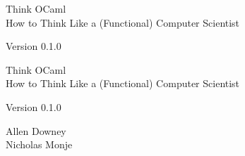 \documentclass[10pt]{book}
\newcommand{\theversion}{0.1.0}
\begin{document}
\frontmatter




\newtheorem{ex}{Exercise}[chapter]

\begin{latexonly}

\renewcommand{\blankpage}{\thispagestyle{empty} \quad \newpage}



\thispagestyle{empty}

\begin{flushright}
\vspace*{2.0in}

\begin{spacing}{3}
{\huge Think OCaml}\\
{\Large How to Think Like a (Functional) Computer Scientist}
\end{spacing}

\vspace{0.25in}

Version \theversion

\vfill

\end{flushright}


\blankpage
\blankpage

\pagebreak
\thispagestyle{empty}

\begin{flushright}
\vspace*{2.0in}

\begin{spacing}{3}
{\huge Think OCaml}\\
{\Large How to Think Like a (Functional) Computer Scientist}
\end{spacing}

\vspace{0.25in}

Version \theversion

\vspace{1in}


{\Large
Allen Downey\\
\large Nicholas Monje\\
}



\end{flushright}
\end{latexonly}
\end{document}
